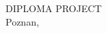 \documentclass[
    12pt,
    english, %
    singlespacing, %
    oneside, %
]{MastersDoctoralThesis} %
\begin{document}
\begin{titlepage}
\begin{center}
            \vfill
            \textsc{\Large DIPLOMA PROJECT}\\[0.5cm]



            \vspace*{\fill}
            {\large Poznan, \the\year{}}

        \end{center}
    \end{titlepage}


%
%
%
\end{document}
